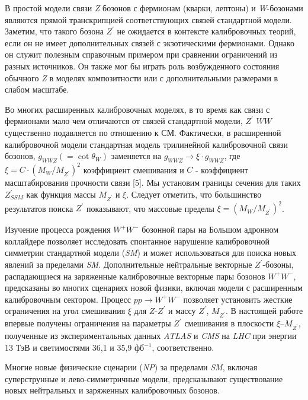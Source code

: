 В простой модели связи \textit{Z} бозонов с фермионам (кварки, лептоны) и \textit{W}-бозонами являются прямой транскрипцией соответствующих связей стандартной модели. Заметим, что такого бозона $Z^\prime$ не ожидается в контексте калибровочных теорий, если он не имеет дополнительных связей с экзотическими фермионами. Однако он служит полезным справочным примером при сравнении ограничений из разных источников. Он также мог бы играть роль возбужденного состояния обычного \textit{Z} в моделях композитности или с дополнительными размерами в слабом масштабе.

Во многих расширенных калибровочных моделях, в то время как связи с фермионами мало чем отличаются от связей стандартной модели, $Z^\prime$ $WW$ существенно подавляется по отношению к СМ. Фактически, в расширенной калибровочной модели стандартная модель трилинейной калибровочной связи бозонов, $g_{WWZ}(=\cot \theta_{W})$ заменяется на $g_{WWZ}\rightarrow\xi \cdot g_{WWZ}$, где $\xi = C \cdot (M_{W}/M_{Z^\prime})^2$ коэффициент смешивания и $C$ - коэффициент масштабирования прочности связи [5]. Мы установим границы сечения для таких $Z^\prime_{SSM}$ как функция массы $M_{Z^\prime}$ и $\xi$. Следует отметить, что большинство результатов поиска $Z^\prime$ показывают, что массовые пределы $\xi = (M_{W}/M_{Z^\prime})^2$.

Изучение процесса рождения ${W}^{+}{W}^{-}$ бозонной пары на Большом адронном коллайдере позволяет исследовать спонтанное нарушение калибровочной симметрии стандартной модели (\textit{SM}) и может использоваться для поиска новых явлений за пределами \textit{SM}. Дополнительные нейтральные векторные ${Z}^{\prime}$-бозоны, распадающиеся на заряженные калибровочные векторные пары бозонов ${W}^{+}{W}^{-}$, предсказаны во многих сценариях новой физики, включая модели с расширенным калибровочным сектором. Процесс $pp \rightarrow {W}^{+}{W}^{-}$  позволяет установить жесткие ограничения на угол смешивания $\xi$ для $Z$-${Z}^{\prime}$ и массу ${Z}^{\prime}$, ${M}_{{Z}^{\prime}}$. В настоящей работе впервые получены ограничения на параметры ${Z}^{\prime}$ смешивания в плоскости $\xi$–${M}_{{Z}^{\prime}}$, полученные из экспериментальных данных \textit{ATLAS} и \textit{CMS} на \textit{LHC} при энергии 13 ТэВ и светимостями 36,1 и 35,9 фб${}^{−1}$, соответственно.

Многие новые физические сценарии (\textit{NP}) за пределами \textit{SM}, включая суперструнные и лево-симметричные модели, предсказывают существование новых нейтральных и заряженных калибровочных бозонов. 

